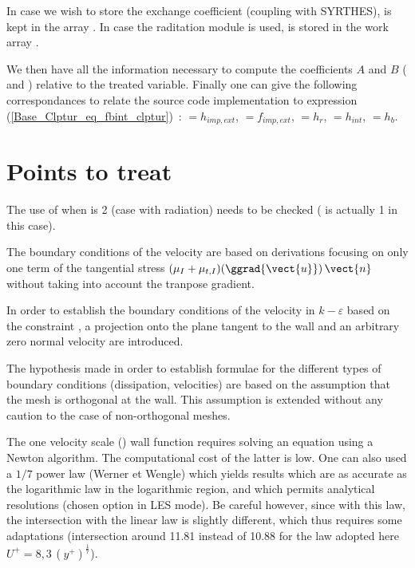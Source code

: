 In case we wish to store the exchange coefficient (coupling with SYRTHES),
 is kept in the array . In case the raditation module
is used,  is stored in the work array .

We then have all the information necessary to compute the coefficients 
$A$ and $B$  ( and ) relative to the treated variable. 
Finally one can give the following correspondances 
to relate the source code implementation to 
expression (\ref{Base_Clptur_eq_fbint_clptur})~:
 $ = h_{imp,ext}$,  $ = f_{imp,ext}$,
 $ = h_r$,  $ = h_{int}$,   $ = h_b$.




\newpage
\section{Points to treat}


The use of  when  is 2 (case with 
radiation) needs to be checked ( is actually 1 in this case).

The boundary conditions of the velocity are based on derivations
focusing on only one term of the tangential stress
$(\mu_I+\mu_{t,I})(\ggrad{\vect{u}})\,\vect{n}$ without taking
into account the tranpose gradient.

In order to establish the boundary conditions of the velocity in 
$k-\varepsilon$ based on the constraint , a projection onto the plane
tangent to the wall and an arbitrary zero normal velocity 
are introduced.

The hypothesis made in order to establish formulae for the different types
of boundary conditions (dissipation, velocities) are based on the assumption
that the mesh is orthogonal at the wall. This assumption is extended 
without any caution to the case of non-orthogonal meshes.

The one velocity scale () wall function requires  
solving an equation using a Newton algorithm.
The computational cost of the latter is low. One can also used 
a  $1/7$ power law (Werner et Wengle) which yields results which are as 
accurate as the logarithmic law in the logarithmic region, and which permits
analytical resolutions (chosen option in LES mode). Be careful however,
since with this law, the intersection with the linear law is
slightly different, which thus requires some adaptations (intersection
around 11.81 instead of 10.88 for the law adopted here 
$U^+=8,3\,(y^+)^\frac{1}{7}$).  


